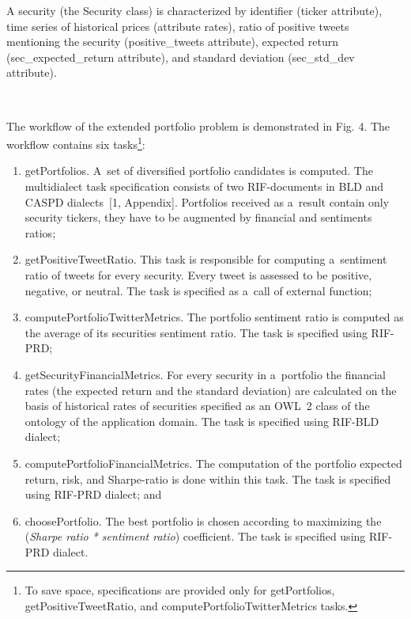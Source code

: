 \begin{multicols}{2}
{  A security (the {\sf Security} class) is characterized by identifier ({\sf ticker}
attribute), time series of historical prices (attribute {\sf
rates}), ratio of positive
tweets mentioning the security ({\sf positive\_tweets} attribute), expected return
({\sf sec\_expected\_return} attribute), and standard deviation ({\sf sec\_std\_dev}
attribute).

\begin{figure*} %
\vspace*{1pt}
 \begin{center}
 \mbox{%
 \epsfxsize=126.24mm
 }
 \end{center}
 \vspace*{-11pt}
\vspace*{-6pt}
  \end{figure*}

The workflow of the extended portfolio problem is demonstrated in Fig. 4. The workflow
contains six tasks\footnote{To save space, specifications are provided only for
{\sf getPortfolios}, {\sf getPositiveTweetRatio}, and
{\sf computePortfolioTwitterMetrics} tasks.}:
\begin{enumerate}[(1)]
\item {\sf getPortfolios}. A~set of diversified portfolio candidates is computed. The
multidialect task specification consists of two RIF-documents in BLD and CASPD
dialects~[1, Appendix]. Portfolios received as a~result contain only security tickers,
they have to be augmented by financial and sentiments ratios;
\item {\sf getPositiveTweetRatio}. This task is responsible for computing a~sentiment ratio of tweets for every security. Every tweet is assessed
to be positive,
negative, or neutral. The task is specified as a~call of external function;
\item {\sf computePortfolioTwitterMetrics}. The portfolio sentiment ratio is
computed as the average of its securities sentiment ratio. The task is specified using
RIF-PRD;
{

}
\item {\sf getSecurityFinancialMetrics}. For every security in a~portfolio the
financial rates (the {\sf expected return} and the {\sf standard deviation}) are
calculated on the basis of historical rates of securities specified as an OWL~2 class of
the ontology of the application domain. The task is specified using RIF-BLD dialect;
\item {\sf computePortfolioFinancialMetrics}. The computation of the portfolio
expected return, risk, and Sharpe-ratio is done within this task. The task is specified
using RIF-PRD dialect; and
\item {\sf choosePortfolio}. The best portfolio is chosen according to maximizing
the (\textit{Sharpe ratio * sentiment ratio}) coefficient. The task is specified using
RIF-PRD dialect.
  \end{enumerate}

}
\end{multicols}

